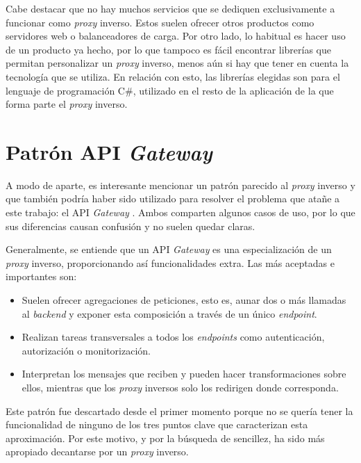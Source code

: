 \documentclass[11pt,spanish,listoffigures]{tfgetsinf}
\begin{document}
Cabe destacar que no hay muchos servicios que se dediquen exclusivamente a funcionar como \emph{proxy} inverso. Estos suelen ofrecer otros productos como servidores web o balanceadores de carga. Por otro lado, lo habitual es hacer uso de un producto ya hecho, por lo que tampoco es fácil encontrar librerías que permitan personalizar un \emph{proxy} inverso, menos aún si hay que tener en cuenta la tecnología que se utiliza. En relación con esto, las librerías elegidas son para el lenguaje de programación C\#, utilizado en el resto de la aplicación de la que forma parte el \emph{proxy} inverso.


	\section{Patrón API \emph{Gateway}}

A modo de aparte, es interesante mencionar un patrón parecido al \emph{proxy} inverso y que también podría haber sido utilizado para resolver el problema que atañe a este trabajo: el API \emph{Gateway} \cite{ApiGateway}. Ambos comparten algunos casos de uso, por lo que sus diferencias causan confusión y no suelen quedar claras.

Generalmente, se entiende que un API \emph{Gateway} es una especialización de un \emph{proxy} inverso, proporcionando así funcionalidades extra. Las más aceptadas e importantes son:

\begin{itemize}
	
	\item Suelen ofrecer agregaciones de peticiones, esto es, aunar dos o más llamadas al \emph{backend} y exponer esta composición a través de un único \emph{endpoint}.
	
	\item Realizan tareas transversales a todos los \emph{endpoints} como autenticación, autorización o monitorización.

	\item Interpretan los mensajes que reciben y pueden hacer transformaciones sobre ellos, mientras que los \emph{proxy} inversos solo los redirigen donde corresponda.

\end{itemize}

Este patrón fue descartado desde el primer momento porque no se quería tener la funcionalidad de ninguno de los tres puntos clave que caracterizan esta aproximación. Por este motivo, y por la búsqueda de sencillez, ha sido más apropiado decantarse por un \emph{proxy} inverso.
\end{document}
